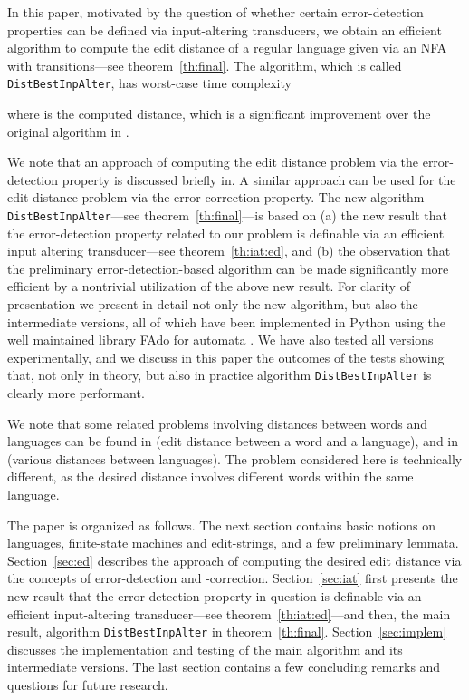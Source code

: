 \documentclass{article}
\theoremstyle{plain}
\theoremstyle{definition}
\theoremstyle{remark}
\begin{document}
\par
In this paper, motivated by the question of whether certain
error-detection properties can be defined via input-altering
transducers, we obtain an efficient algorithm to compute the
edit distance of a regular language given via an NFA with
 transitions---see theorem~\ref{th:final}. The
algorithm, which is called \texttt{DistBestInpAlter}, has worst-case time complexity

where  is the computed distance, which is a significant improvement over the original algorithm in \cite{Kon:2007}.

We note that an approach of computing the edit distance
problem via the error-detection property is
discussed briefly in\cite{KonSil:2010}. A similar approach
can be used for the edit distance problem via the
error-correction property.
The new algorithm \texttt{DistBestInpAlter}---see theorem~\ref{th:final}---is based on
(a) the new result that the error-detection property related to our problem is definable via an efficient input altering transducer---see theorem~\ref{th:iat:ed}, and (b) the
observation that the preliminary error-detection-based algorithm can be made significantly more efficient by
a nontrivial utilization of the above new result.
For clarity
of presentation we present in detail not only the
new algorithm, but also
the intermediate versions, all of which
have been implemented  in Python using the well maintained library
FAdo for automata \cite{Fado}.
We have also tested all versions experimentally,
and we discuss in this paper the outcomes of the tests showing that, not only in theory, but also in practice algorithm \texttt{DistBestInpAlter} is clearly more performant.

We note that some related problems involving distances between
words and languages can be found in
\cite{Wag:1974,Pigh:2001} (edit distance between a word and a language), and in
\cite{Mohri:2003,KKPWX:2003,BPR:icalp2011,HKS:dlt2012,HKS:ciaa2013} (various distances between languages).
The problem considered here is technically different,
as the desired distance involves
different words within the same language.

The paper is organized as follows.
The next section contains basic notions
on languages, finite-state machines and edit-strings, and
a few preliminary lemmata.
Section~\ref{sec:ed} describes the approach of
computing the desired edit distance via the concepts
of error-detection and -correction.
Section~\ref{sec:iat} first presents the new result that
the error-detection property in question is definable via
an efficient input-altering transducer---see
theorem~\ref{th:iat:ed}---and then, the main result, algorithm \texttt{DistBestInpAlter} in theorem~\ref{th:final}.
Section~\ref{sec:implem} discusses the implementation
and testing of the main algorithm and its intermediate versions. The last section
contains a few concluding remarks and questions
for future research.
\end{document}
